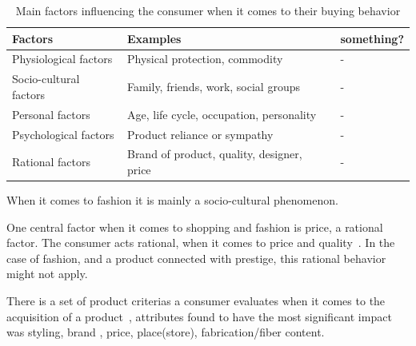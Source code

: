 \begin{table}[H]
    \centering
    \begin{tabular}{l|l|l}
      \textbf{Factors}        & \textbf{Examples} & \textbf{something?} \\ \hline
      Physiological factors   & Physical protection, commodity & - \\ \hline
      Socio-cultural factors  & Family, friends, work, social groups & - \\ \hline
      Personal factors        & Age, life cycle, occupation, personality & - \\ \hline
      Psychological factors   & Product reliance or sympathy & - \\ \hline %
      Rational factors        & Brand of product, quality, designer, price & - \\
    \end{tabular}
    \label{table:FashionFactors}
    \caption [Fashion Factors]{Main factors influencing the consumer when it comes to their buying behavior}
\end{table}

When it comes to fashion it is mainly a socio-cultural phenomenon.

One central factor when it comes to shopping and fashion is price, a rational factor.
The consumer acts rational, when it comes to price and quality~\cite{Hanf1994}.
In the case of fashion, and a product connected with prestige, this rational behavior might not apply.

There is a set of product criterias a consumer evaluates when it comes to the acquisition of a product~\cite{dutton2006}, attributes found to have the most significant impact was styling, brand , price, place(store), fabrication/fiber content.

